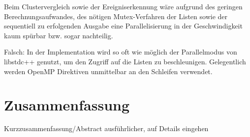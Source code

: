 Beim Clustervergleich sowie der Ereigniserkennung wäre aufgrund des geringen Berechnungsaufwandes, des nötigen Mutex-Verfahren der Listen sowie der sequentiell zu erfolgenden Ausgabe eine Parallelisierung in der Geschwindigkeit kaum spürbar bzw. sogar nachteilig.

Falsch: In der Implementation wird so oft wie möglich der Parallelmodus von libstdc++ genutzt, um den Zugriff auf die Listen zu beschleunigen. %
Gelegentlich werden OpenMP Direktiven unmittelbar an den Schleifen verwendet.





\chapter{Zusammenfassung}
Kurzzusammenfassung/Abstract ausführlicher, auf Details eingehen

